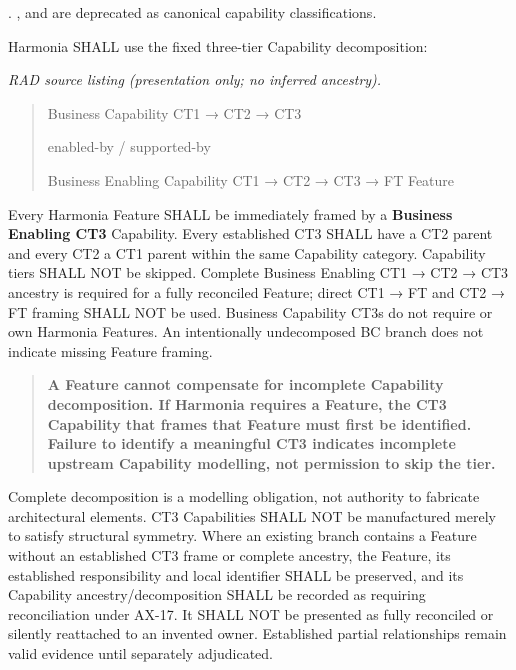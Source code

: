 \texttt{}. \texttt{}, \texttt{} and \texttt{} are deprecated as canonical capability classifications.

\label{rad:metamodel:49}

Harmonia SHALL use the fixed three-tier Capability decomposition:

\label{rad:metamodel:51}

\textit{RAD source listing (presentation only; no inferred ancestry).}
\begin{quote}
Business Capability          CT1 → CT2 → CT3

enabled-by / supported-by

Business Enabling Capability CT1 → CT2 → CT3 → FT Feature
\end{quote}
\label{rad:metamodel:57}

Every Harmonia Feature SHALL be immediately framed by a \textbf{Business Enabling CT3} Capability. Every established CT3 SHALL have a CT2 parent and every CT2 a CT1 parent within the same Capability category. Capability tiers SHALL NOT be skipped. Complete Business Enabling CT1 → CT2 → CT3 ancestry is required for a fully reconciled Feature; direct CT1 → FT and CT2 → FT framing SHALL NOT be used. Business Capability CT3s do not require or own Harmonia Features. An intentionally undecomposed BC branch does not indicate missing Feature framing.

\label{rad:metamodel:59}

\begin{quote}

\textbf{A Feature cannot compensate for incomplete Capability decomposition. If Harmonia requires a Feature, the CT3 Capability that frames that Feature must first be identified. Failure to identify a meaningful CT3 indicates incomplete upstream Capability modelling, not permission to skip the tier.}


\end{quote}
\label{rad:metamodel:61}

Complete decomposition is a modelling obligation, not authority to fabricate architectural elements. CT3 Capabilities SHALL NOT be manufactured merely to satisfy structural symmetry. Where an existing branch contains a Feature without an established CT3 frame or complete ancestry, the Feature, its established responsibility and local identifier SHALL be preserved, and its Capability ancestry/\allowbreak{}decomposition SHALL be recorded as requiring reconciliation under AX-17. It SHALL NOT be presented as fully reconciled or silently reattached to an invented owner. Established partial relationships remain valid evidence until separately adjudicated.

